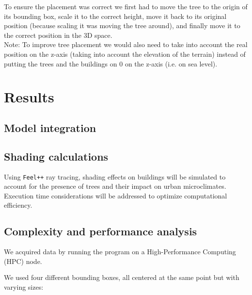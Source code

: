 \documentclass[12pt]{article}
\begin{document}
To ensure the placement was correct we first had to move the tree to the origin
of its bounding box, scale it to the correct height, move it back to its original position
(because scaling it was moving the tree around), and finally move it to the correct position in the 3D space. \\

Note: To improve tree placement we would also need to take into account the real
position on the z-axis (taking into account the elevation of the terrain) instead
of putting the trees and the buildings on 0 on the z-axis (i.e. on sea level).


\section{Results}

\subsection{Model integration}

\subsection{Shading calculations}
Using \texttt{Feel++} ray tracing, shading effects on buildings will be simulated to account for the presence
of trees and their impact on urban microclimates. Execution time considerations will be
addressed to optimize computational efficiency.


\subsection{Complexity and performance analysis}

We acquired data by running the program on a High-Performance Computing (HPC) node.

We used four different bounding boxes, all centered at the same point but with
varying sizes:
\end{document}
